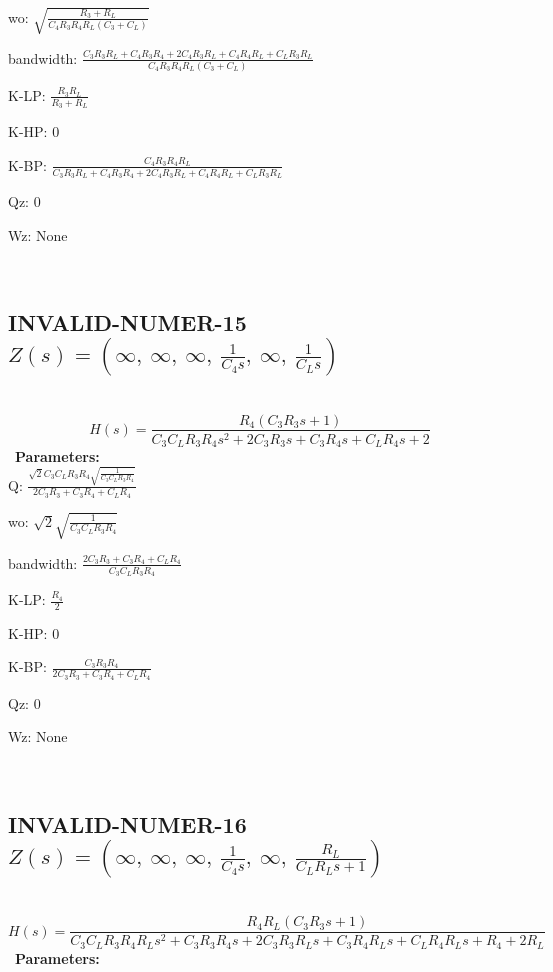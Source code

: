 \documentclass{article}
\begin{document}
wo: $\sqrt{\frac{R_{3} + R_{L}}{C_{4} R_{3} R_{4} R_{L} \left(C_{3} + C_{L}\right)}}$\ 

bandwidth: $\frac{C_{3} R_{3} R_{L} + C_{4} R_{3} R_{4} + 2 C_{4} R_{3} R_{L} + C_{4} R_{4} R_{L} + C_{L} R_{3} R_{L}}{C_{4} R_{3} R_{4} R_{L} \left(C_{3} + C_{L}\right)}$\ 

K-LP: $\frac{R_{3} R_{L}}{R_{3} + R_{L}}$\ 

K-HP: $0$\ 

K-BP: $\frac{C_{4} R_{3} R_{4} R_{L}}{C_{3} R_{3} R_{L} + C_{4} R_{3} R_{4} + 2 C_{4} R_{3} R_{L} + C_{4} R_{4} R_{L} + C_{L} R_{3} R_{L}}$\ 

Qz: $0$\ 

Wz: $\text{None}$\ 

\ 

\subsection{INVALID-NUMER-15 $Z(s) = \left( \infty, \  \infty, \  \infty, \  \frac{1}{C_{4} s}, \  \infty, \  \frac{1}{C_{L} s}\right)$ } \ 
\textbf{\[H(s) = \frac{R_{4} \left(C_{3} R_{3} s + 1\right)}{C_{3} C_{L} R_{3} R_{4} s^{2} + 2 C_{3} R_{3} s + C_{3} R_{4} s + C_{L} R_{4} s + 2}\] } \ 
\textbf{Parameters:}\\ 

Q: $\frac{\sqrt{2} C_{3} C_{L} R_{3} R_{4} \sqrt{\frac{1}{C_{3} C_{L} R_{3} R_{4}}}}{2 C_{3} R_{3} + C_{3} R_{4} + C_{L} R_{4}}$\ 

wo: $\sqrt{2} \sqrt{\frac{1}{C_{3} C_{L} R_{3} R_{4}}}$\ 

bandwidth: $\frac{2 C_{3} R_{3} + C_{3} R_{4} + C_{L} R_{4}}{C_{3} C_{L} R_{3} R_{4}}$\ 

K-LP: $\frac{R_{4}}{2}$\ 

K-HP: $0$\ 

K-BP: $\frac{C_{3} R_{3} R_{4}}{2 C_{3} R_{3} + C_{3} R_{4} + C_{L} R_{4}}$\ 

Qz: $0$\ 

Wz: $\text{None}$\ 

\ 

\subsection{INVALID-NUMER-16 $Z(s) = \left( \infty, \  \infty, \  \infty, \  \frac{1}{C_{4} s}, \  \infty, \  \frac{R_{L}}{C_{L} R_{L} s + 1}\right)$ } \ 
\textbf{\[H(s) = \frac{R_{4} R_{L} \left(C_{3} R_{3} s + 1\right)}{C_{3} C_{L} R_{3} R_{4} R_{L} s^{2} + C_{3} R_{3} R_{4} s + 2 C_{3} R_{3} R_{L} s + C_{3} R_{4} R_{L} s + C_{L} R_{4} R_{L} s + R_{4} + 2 R_{L}}\] } \ 
\textbf{Parameters:}\\ 
\end{document}
